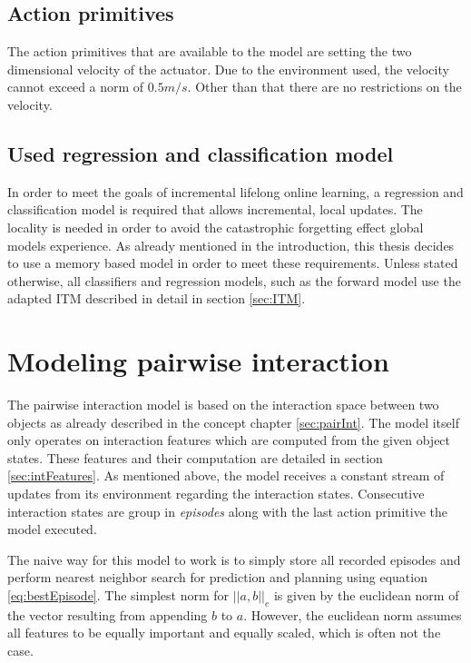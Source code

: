 \subsection{Action primitives}
The action primitives that are available to the model are setting the  two dimensional velocity of the actuator. Due to the environment used, the velocity cannot exceed a norm of $0.5m/s$. Other than that there are no restrictions on the velocity. 


\subsection{Used regression and classification model}

In order to meet the goals of incremental lifelong online learning, a regression and classification model is required that allows incremental, local updates. The locality is needed in order to avoid the catastrophic forgetting effect global models experience. As already mentioned in the introduction, this thesis decides to use a memory based model in order to meet these requirements. Unless stated otherwise, all classifiers and regression models, such as the forward model use the adapted ITM described in detail in section \ref{sec:ITM}.


\section{Modeling pairwise interaction \label{sec:pairRealization}}

The pairwise interaction model is based on the interaction space between two objects as already described in the concept chapter \ref{sec:pairInt}. The model itself only operates on interaction features which are computed from the given object states. These features and their computation are detailed in section \ref{sec:intFeatures}. As mentioned above, the model receives a constant stream of updates from its environment regarding the interaction states. Consecutive interaction states are group in \textit{episodes} along with the last action primitive the model executed. 

The naive way for this model to work is to simply store all recorded episodes and perform nearest neighbor search for prediction and planning using equation \ref{eq:bestEpisode}. The simplest norm for $||a,b||_e$ is given by the euclidean norm of the vector resulting from appending $b$ to $a$. However, the euclidean norm assumes all features to be equally important and equally scaled, which is often not the case.





